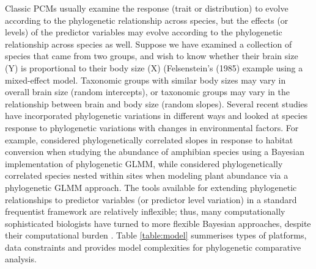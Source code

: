 \documentclass[12pt]{article}
\begin{document}
% 

Classic PCMs usually examine the response (trait or distribution) to evolve according to the phylogenetic relationship across species, but the effects (or levels) of the predictor variables may evolve according to the phylogenetic relationship across species as well.
Suppose we have examined a collection of species that came from two groups, and wish to know whether their brain size (Y) is proportional to their body size (X) (Felsenstein's (1985) example  using a mixed-effect model. 
Taxonomic groups with similar body sizes may vary in overall brain size (random intercepts), or taxonomic groups may vary in the relationship between brain and body size (random slopes). 
Several recent studies have incorporated phylogenetic variations in different ways and looked at species response to phylogenetic variations with changes in environmental factors.
For example, \cite{nowakowski2018phylogenetic} considered phylogenetically correlated slopes in response to habitat conversion when studying the abundance of amphibian species using a Bayesian implementation of phylogenetic GLMM, while \cite{li2017canfun} considered phylogenetically correlated species nested within sites when modeling plant abundance via a phylogenetic GLMM approach. 
The tools available for extending phylogenetic relationships to predictor variables (or predictor level variation) in a standard frequentist framework are relatively inflexible; thus, many computationally sophisticated biologists have turned to more flexible Bayesian approaches, despite their computational burden \citep{hadfield2010mcmc, burkner2016brms}.
Table \ref{table:model} summerises types of platforms, data constraints and provides model complexities for phylogenetic comparative analysis.
\end{document}
